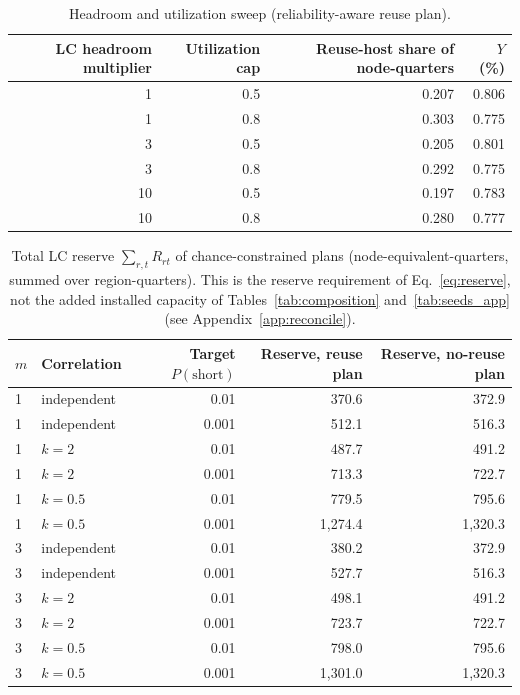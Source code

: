 \documentclass{article} %
\begin{document}
\begin{table}[h]
\caption{Headroom and utilization sweep (reliability-aware reuse plan).}
\label{tab:headroom_app}
\begin{center}
\small
\begin{tabular}{rrrr}
\toprule
LC headroom multiplier & Utilization cap & Reuse-host share of node-quarters & $Y$ (\%) \\
\midrule
1 & 0.5 & 0.207 & 0.806 \\
1 & 0.8 & 0.303 & 0.775 \\
3 & 0.5 & 0.205 & 0.801 \\
3 & 0.8 & 0.292 & 0.775 \\
10 & 0.5 & 0.197 & 0.783 \\
10 & 0.8 & 0.280 & 0.777 \\
\bottomrule
\end{tabular}
\end{center}
\end{table}

\begin{table}[h]
\caption{Total LC reserve $\sum_{r,t} R_{rt}$ of chance-constrained plans (node-equivalent-quarters, summed over region-quarters). This is the reserve requirement of Eq.~\ref{eq:reserve}, not the added installed capacity of Tables~\ref{tab:composition} and~\ref{tab:seeds_app} (see Appendix~\ref{app:reconcile}).}
\label{tab:reserve_app}
\begin{center}
\small
\begin{tabular}{llrrr}
\toprule
$m$ & Correlation & Target $P(\text{short})$ & Reserve, reuse plan & Reserve, no-reuse plan \\
\midrule
1 & independent & 0.01 & 370.6 & 372.9 \\
1 & independent & 0.001 & 512.1 & 516.3 \\
1 & $k=2$ & 0.01 & 487.7 & 491.2 \\
1 & $k=2$ & 0.001 & 713.3 & 722.7 \\
1 & $k=0.5$ & 0.01 & 779.5 & 795.6 \\
1 & $k=0.5$ & 0.001 & 1,274.4 & 1,320.3 \\
3 & independent & 0.01 & 380.2 & 372.9 \\
3 & independent & 0.001 & 527.7 & 516.3 \\
3 & $k=2$ & 0.01 & 498.1 & 491.2 \\
3 & $k=2$ & 0.001 & 723.7 & 722.7 \\
3 & $k=0.5$ & 0.01 & 798.0 & 795.6 \\
3 & $k=0.5$ & 0.001 & 1,301.0 & 1,320.3 \\
\bottomrule
\end{tabular}
\end{center}
\end{table}
\end{document}
